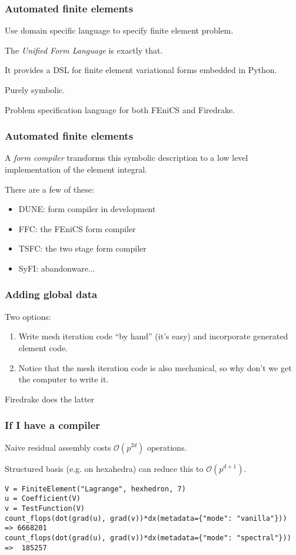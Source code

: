 \documentclass[presentation]{beamer}
\begin{document}
\begin{frame}
  \frametitle{Automated finite elements}
  Use domain specific language to specify finite element problem.

  The \emph{Unified Form Language} \parencite{Alnaes:2014} is exactly
  that.

  It provides a DSL for finite element variational forms embedded in
  Python.

  Purely symbolic.

  Problem specification language for both FEniCS and Firedrake.
\end{frame}

\begin{frame}
  \frametitle{Automated finite elements}
  A \emph{form compiler} transforms this symbolic description to a low
  level implementation of the element integral.

  There are a few of these:

  \begin{itemize}
  \item DUNE: form compiler in development
  \item FFC: the FEniCS form compiler
  \item TSFC: the two stage form compiler
  \item SyFI: abandonware...
  \end{itemize}
\end{frame}

\begin{frame}
  \frametitle{Adding global data}
  Two options:
  \begin{enumerate}
  \item Write mesh iteration code ``by hand'' (it's easy) and
    incorporate generated element code.
  \item Notice that the mesh iteration code is also mechanical, so why
    don't we get the computer to write it.
  \end{enumerate}

  Firedrake does the latter
\end{frame}

\begin{frame}[fragile]
  \frametitle{If I have a compiler}
  Naive residual assembly costs $\mathcal{O}(p^{2d})$ operations.

  Structured basis (e.g. on hexahedra) can reduce this to $\mathcal{O}(p^{d + 1})$.
\begin{verbatim}
V = FiniteElement("Lagrange", hexhedron, 7)
u = Coefficient(V)
v = TestFunction(V)
count_flops(dot(grad(u), grad(v))*dx(metadata={"mode": "vanilla"}))  => 6668201
count_flops(dot(grad(u), grad(v))*dx(metadata={"mode": "spectral"})) =>  185257
\end{verbatim}
\end{frame}
\end{document}
